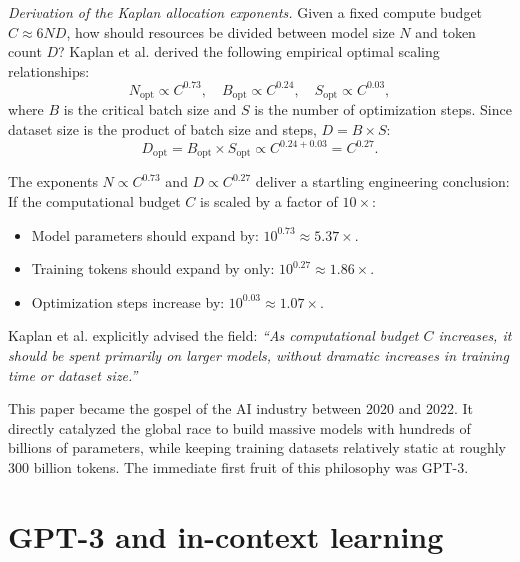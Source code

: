 \documentclass[../../main.tex]{subfiles}
\begin{document}
\textit{Derivation of the Kaplan allocation exponents.}
Given a fixed compute budget $C \approx 6ND$, how should resources be divided between model size $N$ and token count $D$?
Kaplan et al. derived the following empirical optimal scaling relationships:
\begin{equation}
\label{eq:kaplan_optimal_scaling}
N_{\text{opt}} \propto C^{0.73}, \quad B_{\text{opt}} \propto C^{0.24}, \quad S_{\text{opt}} \propto C^{0.03},
\end{equation}
where $B$ is the critical batch size and $S$ is the number of optimization steps. 
Since dataset size is the product of batch size and steps, $D = B \times S$:
\begin{equation}
\label{eq:kaplan_dataset_scaling}
D_{\text{opt}} = B_{\text{opt}} \times S_{\text{opt}} \propto C^{0.24 + 0.03} = C^{0.27}.
\end{equation}

The exponents $N \propto C^{0.73}$ and $D \propto C^{0.27}$ deliver a startling engineering conclusion:
If the computational budget $C$ is scaled by a factor of $10\times$:
\begin{itemize}
    \item Model parameters should expand by: $10^{0.73} \approx 5.37\times$.
    \item Training tokens should expand by only: $10^{0.27} \approx 1.86\times$.
    \item Optimization steps increase by: $10^{0.03} \approx 1.07\times$.
\end{itemize}

Kaplan et al. explicitly advised the field: \emph{``As computational budget $C$ increases, it should be spent primarily on larger models, without dramatic increases in training time or dataset size.''}

This paper became the gospel of the AI industry between 2020 and 2022. It directly catalyzed the global race to build massive models with hundreds of billions of parameters, while keeping training datasets relatively static at roughly 300 billion tokens. The immediate first fruit of this philosophy was GPT-3.

\clearpage
\section{GPT-3 and in-context learning}
\label{sec:gpt3_architecture}
\end{document}
